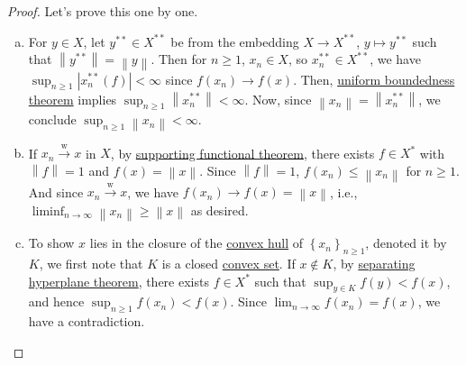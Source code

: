 \begin{proof}
	Let's prove this one by one.
	\begin{enumerate}[(a)]
		\item For \(y\in X\), let \(y^{\ast\ast}\in X^{\ast\ast}\) be from the embedding \(X\to X^{\ast\ast}\), \(y \mapsto y^{\ast\ast}\) such that \(\left\lVert y^{\ast\ast}\right\rVert = \left\lVert y\right\rVert \). Then for \(n \geq 1\), \(x_n \in X\), so \(x_n^{\ast\ast}\in X^{\ast\ast}\), we have \(\sup _{n\geq 1} \left\vert x_n^{\ast\ast}(f) \right\vert < \infty\) since \(f(x_n)\to f(x)\). Then, \hyperref[thm:uniform-boundedness]{uniform boundedness theorem} implies \(\sup _{n\geq 1} \left\lVert x_n^{\ast\ast}\right\rVert < \infty \). Now, since \(\left\lVert x_n\right\rVert = \left\lVert x_n^{\ast\ast}\right\rVert \), we conclude \(\sup _{n\geq 1}\left\lVert x_n\right\rVert < \infty\).
		\item If \(x_n \overset{\text{w}}{\to } x\) in \(X\), by \hyperref[thm:supporting-functional]{supporting functional theorem}, there exists \(f\in X^{\ast} \) with \(\left\lVert f\right\rVert = 1\) and \(f(x) = \left\lVert x\right\rVert\). Since \(\left\lVert f\right\rVert = 1\), \(f(x_n) \leq \left\lVert x_n\right\rVert\) for \(n \geq 1\). And since \(x_n \overset{\text{w}}{\to } x\), we have \(f(x_n)\to f(x)= \left\lVert x\right\rVert \), i.e., \(\liminf_{n \to \infty} \left\lVert x_n\right\rVert \geq \left\lVert x\right\rVert\) as desired.
		\item To show \(x\) lies in the closure of the \href{https://en.wikipedia.org/wiki/Convex_hull}{convex hull} of \(\left\{ x_n \right\} _{n\geq 1}\), denoted it by \(K\), we first note that \(K\) is a closed \hyperref[def:convex-set]{convex set}. If \(x \notin K\), by \hyperref[thm:separation-of-convex-sets]{separating hyperplane theorem}, there exists \(f\in X^{\ast} \) such that \(\sup _{y\in K}f(y) < f(x)\), and hence \(\sup _{n\geq 1}f(x_n) < f(x)\). Since \(\lim_{n \to \infty} f(x_n)=f(x)\), we have a contradiction.
	\end{enumerate}
\end{proof}

